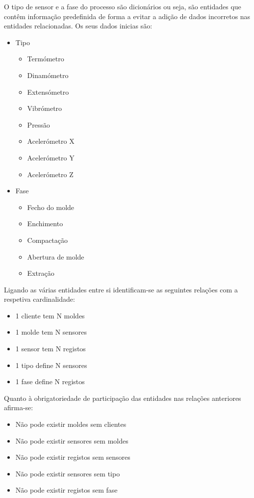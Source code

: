 \documentclass[11pt,twoside,a4paper]{report}
\begin{document}
O tipo de sensor e a fase do processo são dicionários ou seja, são entidades que contêm informação predefinida de forma a evitar a adição de dados incorretos nas entidades relacionadas. Os seus dados inicias são:
\begin{itemize}[noitemsep]
	\item Tipo
	\begin{itemize}[noitemsep]
		\item Termómetro
		\item Dinamómetro
		\item Extensómetro
		\item Vibrómetro
		\item Pressão
		\item Acelerómetro X
		\item Acelerómetro Y
		\item Acelerómetro Z
	\end{itemize}
	\newpage
	\item Fase
	\begin{itemize}[noitemsep]
		\item Fecho do molde
		\item Enchimento
		\item Compactação
		\item Abertura de molde
		\item Extração
	\end{itemize}
\end{itemize}
Ligando as várias entidades entre si identificam-se as seguintes relações com a respetiva cardinalidade:
\begin{itemize}[noitemsep]
	\item 1 cliente tem N moldes
	\item 1 molde tem N sensores
	\item 1 sensor tem N registos
	\item 1 tipo define N sensores
	\item 1 fase define N registos
\end{itemize}
Quanto à obrigatoriedade de participação das entidades nas relações anteriores afirma-se:
\begin{itemize}[noitemsep]
	\item Não pode existir moldes sem clientes
	\item Não pode existir sensores sem moldes
	\item Não pode existir registos sem sensores
	\item Não pode existir sensores sem tipo
	\item Não pode existir registos sem fase	
\end{itemize}
\end{document}

